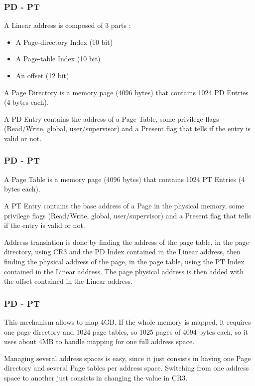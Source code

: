 \begin{frame}
  \frametitle{PD - PT}

  A Linear address is composed of 3 parts :

  \begin{itemize}
  \item A Page-directory Index (10 bit)
  \item A Page-table Index (10 bit)
  \item An offset (12 bit)
  \end{itemize}

  A Page Directory is a memory page (4096 bytes) that contains 1024 PD Entries (4 bytes each).

  \-

  A PD Entry contains the address of a Page Table, some privilege flags (Read/Write, global, user/supervisor) and a Present flag that tells if the entry is valid or not.

  \-

\end{frame}

\begin{frame}
  \frametitle{PD - PT}

  A Page Table is a memory page (4096 bytes) that contains 1024 PT Entries (4 bytes each).

  \-

  A PT Entry contains the base address of a Page in the physical memory, some privilege flags (Read/Write, global, user/supervisor) and a Present flag that tells if the entry is valid or not.

  \-

  Address translation is done by finding the address of the page table, in the page directory, using CR3 and the PD Index contained in the Linear address, then finding the physical address of the page, in the page table, using the PT Index contained in the Linear address. The page physical address is then added with the offset contained in the Linear address.

\end{frame}

\begin{frame}
  \frametitle{PD - PT}

  This mechanism allows to map 4GB. If the whole memory is mapped, it requires one page directory and 1024 page tables, so 1025 pages of 4094 bytes each, so it uses about 4MB to handle mapping for one full address space.

  \-

  Managing several address spaces is easy, since it just consists in having one Page directory and several Page tables per address space. Switching from one address space to another just consists in changing the value in CR3.

\end{frame}

